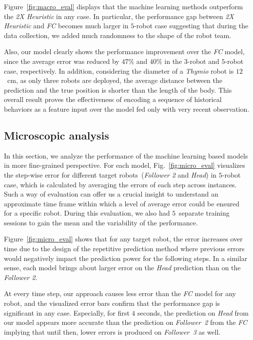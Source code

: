 \documentclass[letterpaper, 10 pt, conference]{ieeeconf}  %
\begin{document}
	Figure~\ref{fig:macro_eval} displays that the machine learning methods outperform
	the \emph{2X Heuristic} in any case. In particular, the performance gap between
	\emph{2X Heuristic} and \emph{FC} becomes much larger in $5$-robot case suggesting that
	during the data collection, we added much randomness to the shape of the robot team.

	Also, our model clearly shows the performance improvement over the \emph{FC} model, since
	the average error was reduced by $47\%$ and $40\%$ in the $3$-robot and $5$-robot case,
	respectively. In addition, considering the diameter of a \emph{Thymio} robot is
	$12$~cm, as only three robots are deployed, the average distance between the prediction
	and the true position is shorter than the length of the body. This overall result proves
	the effectiveness of encoding a sequence of historical behaviors as a feature input
	over the model fed only with very recent observation.


	\subsection{Microscopic analysis}
	\label{sec:microscopic_analysis}

	In this section, we analyze the performance of the machine learning based models
	in more fine-grained perspective. For each model, Fig.~\ref{fig:micro_eval} visualizes the
	step-wise error for different target robots~(\emph{Follower 2} and \emph{Head})
	in $5$-robot case, which is calculated by averaging the errors of each step across instances.
	Such a way of evaluation can offer us a crucial insight to understand an approximate time frame
	within which a level of average error could be ensured for a specific robot. During this
	evaluation, we also had $5$~separate training sessions to gain the mean and the variability
	of the performance.

	Figure~\ref{fig:micro_eval} shows that for any target robot, the error increases over time due to the
	design of the repetitive prediction method where previous errors would negatively
	impact the prediction power for the following steps. In a similar sense, each model
	brings about larger error on the \emph{Head} prediction than on the \emph{Follower 2}.

	At every time step, our approach causes less error than the \emph{FC} model for any robot, and
    the visualized error bars confirm that the performance gap is significant in any case.
    Especially, for first $4$ seconds, the prediction on \emph{Head} from our model appears
    more accurate than the prediction on \emph{Follower~2} from the \emph{FC} implying that
    until then, lower errors is produced on \emph{Follower~3} as well.
\end{document}
